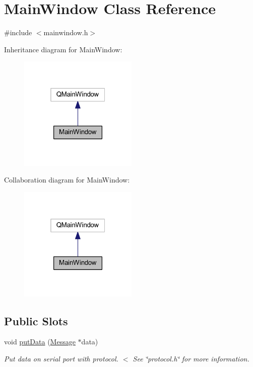 \hypertarget{class_main_window}{}\section{Main\+Window Class Reference}
\label{class_main_window}


{\ttfamily \#include $<$mainwindow.\+h$>$}



Inheritance diagram for Main\+Window\+:
\nopagebreak
\begin{figure}[H]
\begin{center}
\leavevmode
\includegraphics[width=160pt]{class_main_window__inherit__graph}
\end{center}
\end{figure}


Collaboration diagram for Main\+Window\+:
\nopagebreak
\begin{figure}[H]
\begin{center}
\leavevmode
\includegraphics[width=160pt]{class_main_window__coll__graph}
\end{center}
\end{figure}
\subsection*{Public Slots}
\begin{DoxyCompactItemize}
\item 
void \hyperlink{class_main_window_a42f3e1ec38bdf049152b5bf0cf1e0fc6}{put\+Data} (\hyperlink{protocol_8h_ae5051f6f612e6d4218717f733bc50667}{Message} $\ast$data)
\begin{DoxyCompactList}\small\item\em Put data on serial port with protocol. $<$ See \char`\"{}protocol.\+h\char`\"{} for more information. \end{DoxyCompactList}\end{DoxyCompactItemize}
